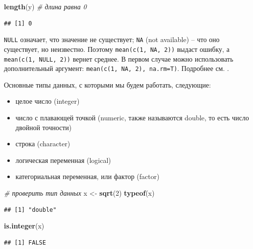 \documentclass[
]{book}
\newenvironment{Shaded}{\begin{snugshade}}{\end{snugshade}}
\newcommand{\CommentTok}[1]{\textcolor[rgb]{0.56,0.35,0.01}{\textit{#1}}}
\newcommand{\DecValTok}[1]{\textcolor[rgb]{0.00,0.00,0.81}{#1}}
\newcommand{\FunctionTok}[1]{\textcolor[rgb]{0.13,0.29,0.53}{\textbf{#1}}}
\newcommand{\NormalTok}[1]{#1}
\newcommand{\OtherTok}[1]{\textcolor[rgb]{0.56,0.35,0.01}{#1}}
\providecommand{\tightlist}{%
  \setlength{\itemsep}{0pt}\setlength{\parskip}{0pt}}
\theoremstyle{definition}
\theoremstyle{definition}
\theoremstyle{definition}
\theoremstyle{definition}
\theoremstyle{remark}
\begin{document}
\begin{Shaded}
\begin{Highlighting}[]
\FunctionTok{length}\NormalTok{(y) }\CommentTok{\# длина равна 0}
\end{Highlighting}
\end{Shaded}

\begin{verbatim}
## [1] 0
\end{verbatim}

\texttt{NULL} означает, что значение не существует; \texttt{NA} (not available) -- что оно существует, но неизвестно. Поэтому \texttt{mean(c(1,\ NA,\ 2))} выдаст ошибку, а \texttt{mean(c(1,\ NULL,\ 2))} вернет среднее. В первом случае можно использовать дополнительный аргумент: \texttt{mean(c(1,\ NA,\ 2),\ na.rm=T)}. Подробнее см. \citep{мэтлофф2019}.

Основные типы данных, с которыми мы будем работать, следующие:

\begin{itemize}
\tightlist
\item
  целое число (integer)
\item
  число с плавающей точкой (numeric, также называются double, то есть число двойной точности)
\item
  строка (character)
\item
  логическая переменная (logical)
\item
  категориальная переменная, или фактор (factor)
\end{itemize}

\begin{Shaded}
\begin{Highlighting}[]
\CommentTok{\# проверить тип данных }
\NormalTok{x }\OtherTok{\textless{}{-}} \FunctionTok{sqrt}\NormalTok{(}\DecValTok{2}\NormalTok{)}
\FunctionTok{typeof}\NormalTok{(x)}
\end{Highlighting}
\end{Shaded}

\begin{verbatim}
## [1] "double"
\end{verbatim}

\begin{Shaded}
\begin{Highlighting}[]
\FunctionTok{is.integer}\NormalTok{(x)}
\end{Highlighting}
\end{Shaded}

\begin{verbatim}
## [1] FALSE
\end{verbatim}
\end{document}
